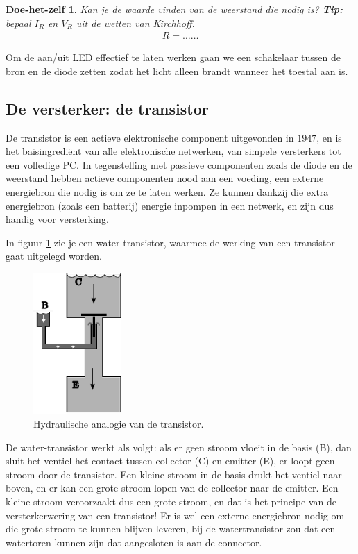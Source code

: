 \documentclass{article}
\newtheorem{DIY}{Doe-het-zelf}
\begin{document}
			\begin{DIY} Kan je de waarde vinden van de weerstand die nodig is? \textbf{Tip:} bepaal $I_R$ en $V_R$ uit de wetten van Kirchhoff.
			\begin{align}
			    R = \ldots\ldots
			\end{align}
			\end{DIY}

			Om de aan/uit LED effectief te laten werken gaan we een schakelaar tussen de bron en de diode zetten zodat het licht alleen brandt wanneer het toestal aan is.

		\subsection{De versterker: de transistor}
			De transistor is een actieve elektronische component uitgevonden in $1947$, en is het baisingredi\"ent van alle elektronische netwerken, van simpele versterkers tot een volledige PC. In tegenstelling met passieve componenten zoals de diode en de weerstand hebben actieve componenten nood aan een voeding, een externe energiebron die nodig is om ze te laten werken. Ze kunnen dankzij die extra energiebron (zoals een batterij) energie inpompen in een netwerk, en zijn dus handig voor versterking.

			In figuur \ref{fig:watertransistor} zie je een water-transistor, waarmee de werking van een transistor gaat uitgelegd worden. \begin{figure}[htbp]
				\centering
				\includegraphics[width=0.3\textwidth]{watertransistor}
				\caption{Hydraulische analogie van de transistor.}
				\label{fig:watertransistor}
			\end{figure}

			De water-transistor werkt als volgt: als er geen stroom vloeit in de basis (B), dan sluit het ventiel het contact tussen collector (C) en emitter (E), er loopt geen stroom door de transistor. Een kleine stroom in de basis drukt het ventiel naar boven, en er kan een grote stroom lopen van de collector naar de emitter. Een kleine stroom veroorzaakt dus een grote stroom, en dat is het principe van de versterkerwering van een transistor! Er is wel een externe energiebron nodig om die grote stroom te kunnen blijven leveren, bij de watertransistor zou dat een watertoren kunnen zijn dat aangesloten is aan de connector.
\end{document}
